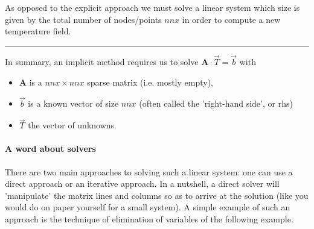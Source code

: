 \begin{center}
\begin{minipage}[t]{0.77\textwidth}
As opposed to the explicit approach we must solve a linear system which size is given 
by the total number of nodes/points $nnx$ in order to compute a new temperature field.

\par\noindent\rule{\textwidth}{0.4pt}
\end{minipage}
\end{center}

\noindent In summary, an implicit method requires us to solve ${\bm A}\cdot\vec{T} = \vec{b}$ with
\begin{itemize}
\item ${\bm A}$ is a $nnx \times nnx$  {\color{olive}sparse} matrix (i.e. mostly empty),
\item ${\vec b}$ is a known vector of size $nnx$ (often called the 'right-hand side', or {\color{olive} rhs})
\item ${\vec T}$ the vector of unknowns.
\end{itemize}

\paragraph{A word about solvers}
There are two main approaches to solving such a linear system: one can use a {\color{olive} direct}
approach or an {\color{olive} iterative} approach. 
In a nutshell, a direct solver will 'manipulate' the matrix lines and columns 
so as to arrive at the solution (like you would do on paper yourself for a small system). 
A simple example of such an approach is the 
technique of elimination of variables of the following example.

